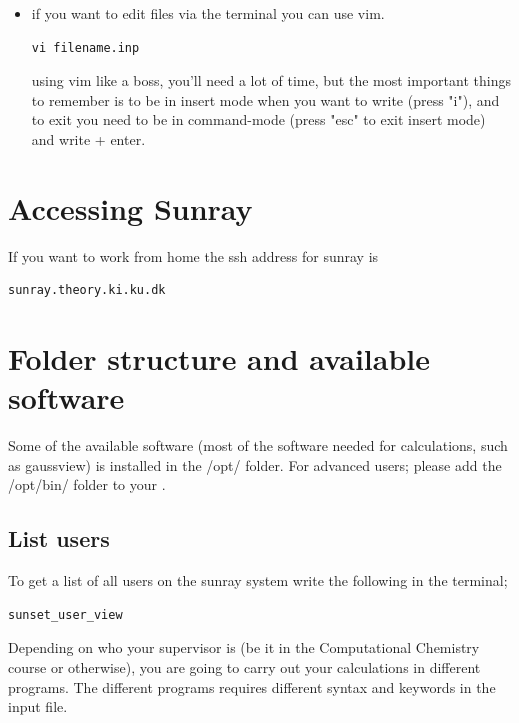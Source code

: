 \documentclass{article}
\begin{document}
\begin{itemize}
    \item {} if you want to edit files via the terminal you can use vim. 
\begin{lstlisting}
vi filename.inp
\end{lstlisting}
using vim like a boss, you'll need a lot of time, but the most important things to remember is to be in insert mode when you want to write (press "i"), and to exit you need to be in command-mode (press "esc" to exit insert mode) and write  + enter.

\end{itemize}

\newpage
\section{Accessing Sunray}

If you want to work from home the ssh address for sunray is

\begin{lstlisting}
sunray.theory.ki.ku.dk
\end{lstlisting}






\newpage
\section{Folder structure and available software}

Some of the available software (most of the software needed for calculations, such as gaussview) is installed in the /opt/ folder. For advanced users; please add the /opt/bin/ folder to your .\\

\subsection*{List users}

To get a list of all users on the sunray system write the following in the terminal;

\begin{lstlisting}
sunset_user_view
\end{lstlisting}



Depending on who your supervisor is (be it in the Computational Chemistry course or otherwise), you are going to carry out your calculations in different programs.
The different programs requires different syntax and keywords in the input file.\\
\end{document}
